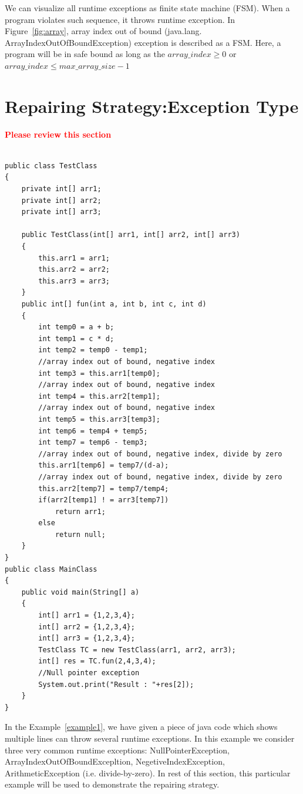 \documentclass{sigplanconf}
\begin{document}
We can visualize all runtime exceptions as finite state machine (FSM). When a program violates such sequence, it throws runtime exception. 
In Figure~\ref{fig:array}, array index out of bound (java.lang. ArrayIndexOutOfBoundException) exception is described as a FSM. 
Here, a program will be in safe bound as long as the $array\_index \geq 0$ or $array\_index \leq max\_array\_size - 1$


\section{Repairing Strategy:Exception Type}
\label{sec:strgEx}

\textcolor{red}{\textbf{Please review this section}}\newline


\lstset{language=Java, caption=Java code which may throws runtime exceptions, label=example1}
\begin{lstlisting}

public class TestClass
{
	private int[] arr1;
	private int[] arr2;
	private int[] arr3;
		
	public TestClass(int[] arr1, int[] arr2, int[] arr3)
	{
		this.arr1 = arr1;
		this.arr2 = arr2;
		this.arr3 = arr3;
	}
	public int[] fun(int a, int b, int c, int d)
	{
		int temp0 = a + b;
		int temp1 = c * d;
		int temp2 = temp0 - temp1;
		//array index out of bound, negative index
		int temp3 = this.arr1[temp0];
		//array index out of bound, negative index
		int temp4 = this.arr2[temp1];
		//array index out of bound, negative index
		int temp5 = this.arr3[temp3];
		int temp6 = temp4 + temp5;
		int temp7 = temp6 - temp3;
		//array index out of bound, negative index, divide by zero
		this.arr1[temp6] = temp7/(d-a);
		//array index out of bound, negative index, divide by zero
		this.arr2[temp7] = temp7/temp4;
		if(arr2[temp1] ! = arr3[temp7])
			return arr1;
		else
			return null;
	}
}
public class MainClass 
{
	public void main(String[] a) 
	{
		int[] arr1 = {1,2,3,4};
		int[] arr2 = {1,2,3,4};
		int[] arr3 = {1,2,3,4};
		TestClass TC = new TestClass(arr1, arr2, arr3);
		int[] res = TC.fun(2,4,3,4);
		//Null pointer exception
		System.out.print("Result : "+res[2]);
	}    
}
\end{lstlisting}

In the Example~\ref{example1}, we have given a piece of java code which shows multiple lines can throw several runtime exceptions. 
In this example we consider three very common runtime exceptions: NullPointerException, ArrayIndexOutOfBoundExcepltion, NegetiveIndexException, 
ArithmeticException (i.e. divide-by-zero). In rest of this section, this particular example will be used to demonstrate the repairing strategy.
\end{document}
